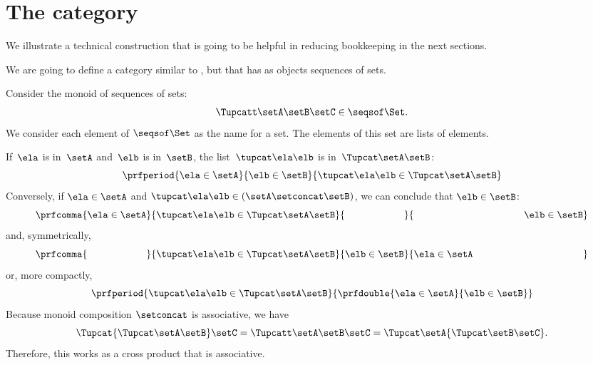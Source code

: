 \section{The \SetL category}
\label{sec:SetL}

We illustrate a technical construction that is going to be helpful in reducing bookkeeping in the next sections.

We are going to define a category similar to \Set, but that has as objects sequences of sets.

Consider the monoid of sequences of sets:
%
\begin{equation}
    \label{eq:sets-monoid}
    \Tupcatt \setA  \setB  \setC \in \seqsof\Set.
\end{equation}
%
We consider each element of $\seqsof\Set$ as the name for a set.
The elements of this set are lists of elements.

If~$\ela$ is in~$\setA$ and~$\elb$ is in~$\setB$, the list~$\tupcat \ela \elb$ is in~$\Tupcat \setA \setB$:
%
\begin{equation}
    \label{eq:sets-monoid-axiom1}
    \prfperiod{
        \ela \in \setA
    }{
        \elb \in \setB
    }{
        \tupcat \ela \elb \in \Tupcat \setA \setB
    }
\end{equation}
%
Conversely, if $\ela \in \setA$ and $\tupcat \ela \elb \in (\setA \setconcat \setB)$, we can conclude that $\elb \in \setB$:
%
\begin{equation}
    \label{eq:sets-monoid-axiom2}
    \prfcomma{
        \ela \in \setA
    }{
        \tupcat \ela \elb \in \Tupcat \setA  \setB
    }{
        \phantom{\elb \in \setB}
    }{
        \rule{39mm}{0pt} \elb \in  \setB
    }
\end{equation}
%
and, symmetrically,
%
\begin{equation}
    \label{eq:sets-monoid-axiom3}
    \prfcomma{
        \phantom{\ela \in \setA}
    }{
        \tupcat \ela \elb \in \Tupcat \setA \setB
    }{
        \elb \in \setB
    }{
        \ela \in  \setA \rule{39mm}{0pt}
    }
\end{equation}
%
or, more compactly,
%
\begin{equation}
    \label{eq:sets-monoid-axiom3bis}
    \prfperiod{
        \tupcat \ela \elb \in \Tupcat \setA \setB
    }{
        \prfdouble{
            \ela \in \setA
        }{
            \elb \in \setB
        }
    }
\end{equation}
%
Because monoid composition $\setconcat$ is associative, we have
%
\begin{equation}
    \label{eq:sets-monoid-comp}
    \Tupcat {\Tupcat \setA  \setB}  \setC  =
    \Tupcatt \setA    \setB \setC  =
    \Tupcat   \setA  {\Tupcat \setB  \setC}.
\end{equation}
%
Therefore, this works as a cross product that is associative.

